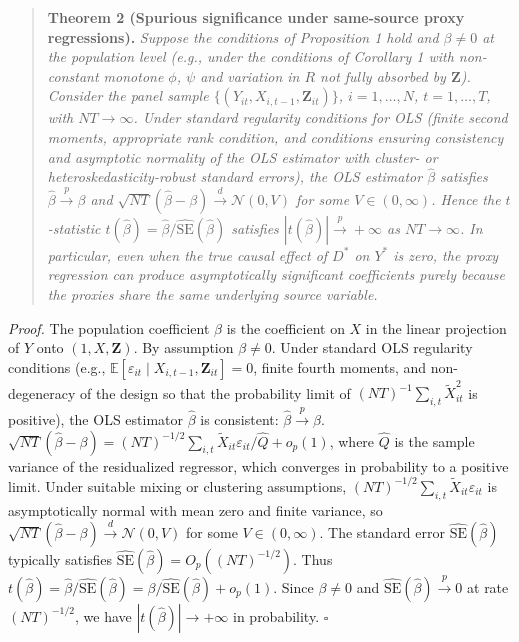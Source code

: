 \begin{quote}
\textbf{Theorem 2 (Spurious significance under same-source proxy regressions).} \textit{Suppose the conditions of Proposition 1 hold and $\beta \neq 0$ at the population level (e.g., under the conditions of Corollary 1 with non-constant monotone $\phi$, $\psi$ and variation in $R$ not fully absorbed by $\mathbf{Z}$). Consider the panel sample $\{(Y_{it}, X_{i,t-1}, \mathbf{Z}_{it})\}$, $i = 1, \ldots, N$, $t = 1, \ldots, T$, with $N T \to \infty$. Under standard regularity conditions for OLS (finite second moments, appropriate rank condition, and conditions ensuring consistency and asymptotic normality of the OLS estimator with cluster- or heteroskedasticity-robust standard errors), the OLS estimator $\hat{\beta}$ satisfies $\hat{\beta} \xrightarrow{p} \beta$ and $\sqrt{NT}(\hat{\beta} - \beta) \xrightarrow{d} \mathcal{N}(0, V)$ for some $V \in (0, \infty)$. Hence the $t$-statistic $t(\hat{\beta}) = \hat{\beta} / \widehat{\mathrm{SE}}(\hat{\beta})$ satisfies $|t(\hat{\beta})| \xrightarrow{p} +\infty$ as $N T \to \infty$. In particular, even when the true causal effect of $D^*$ on $Y^*$ is zero, the proxy regression can produce asymptotically significant coefficients purely because the proxies share the same underlying source variable.}
\end{quote}

\noindent\textit{Proof.} The population coefficient $\beta$ is the coefficient on $X$ in the linear projection of $Y$ onto $(1, X, \mathbf{Z})$. By assumption $\beta \neq 0$. Under standard OLS regularity conditions (e.g., $\mathbb{E}[\varepsilon_{it} \mid X_{i,t-1}, \mathbf{Z}_{it}] = 0$, finite fourth moments, and non-degeneracy of the design so that the probability limit of $(NT)^{-1} \sum_{i,t} \tilde{X}_{it}^2$ is positive), the OLS estimator $\hat{\beta}$ is consistent: $\hat{\beta} \xrightarrow{p} \beta$. $\sqrt{NT}(\hat{\beta} - \beta) = (NT)^{-1/2} \sum_{i,t} \tilde{X}_{it} \varepsilon_{it} / \widehat{Q} + o_p(1)$, where $\widehat{Q}$ is the sample variance of the residualized regressor, which converges in probability to a positive limit. Under suitable mixing or clustering assumptions, $(NT)^{-1/2} \sum_{i,t} \tilde{X}_{it} \varepsilon_{it}$ is asymptotically normal with mean zero and finite variance, so $\sqrt{NT}(\hat{\beta} - \beta) \xrightarrow{d} \mathcal{N}(0, V)$ for some $V \in (0, \infty)$. The standard error $\widehat{\mathrm{SE}}(\hat{\beta})$ typically satisfies $\widehat{\mathrm{SE}}(\hat{\beta}) = O_p((NT)^{-1/2})$. Thus $t(\hat{\beta}) = \hat{\beta} / \widehat{\mathrm{SE}}(\hat{\beta}) = \beta / \widehat{\mathrm{SE}}(\hat{\beta}) + o_p(1)$. Since $\beta \neq 0$ and $\widehat{\mathrm{SE}}(\hat{\beta}) \xrightarrow{p} 0$ at rate $(NT)^{-1/2}$, we have $|t(\hat{\beta})| \to +\infty$ in probability. \hfill $\square$

